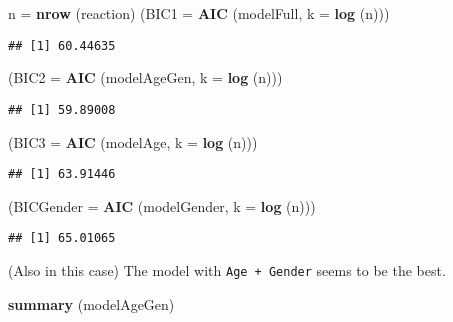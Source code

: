 \documentclass[
]{article}
\newenvironment{Shaded}{\begin{snugshade}}{\end{snugshade}}
\newcommand{\DataTypeTok}[1]{\textcolor[rgb]{0.13,0.29,0.53}{#1}}
\newcommand{\KeywordTok}[1]{\textcolor[rgb]{0.13,0.29,0.53}{\textbf{#1}}}
\newcommand{\NormalTok}[1]{#1}
\newcommand{\StringTok}[1]{\textcolor[rgb]{0.31,0.60,0.02}{#1}}
\begin{document}
\begin{Shaded}
\begin{Highlighting}[]
\NormalTok{n =}\StringTok{ }\KeywordTok{nrow}\NormalTok{ (reaction)}
\NormalTok{(}\DataTypeTok{BIC1 =} \KeywordTok{AIC}\NormalTok{ (modelFull, }\DataTypeTok{k =} \KeywordTok{log}\NormalTok{ (n)))}
\end{Highlighting}
\end{Shaded}

\begin{verbatim}
## [1] 60.44635
\end{verbatim}

\begin{Shaded}
\begin{Highlighting}[]
\NormalTok{(}\DataTypeTok{BIC2 =} \KeywordTok{AIC}\NormalTok{ (modelAgeGen, }\DataTypeTok{k =} \KeywordTok{log}\NormalTok{ (n)))}
\end{Highlighting}
\end{Shaded}

\begin{verbatim}
## [1] 59.89008
\end{verbatim}

\begin{Shaded}
\begin{Highlighting}[]
\NormalTok{(}\DataTypeTok{BIC3 =} \KeywordTok{AIC}\NormalTok{ (modelAge, }\DataTypeTok{k =} \KeywordTok{log}\NormalTok{ (n)))}
\end{Highlighting}
\end{Shaded}

\begin{verbatim}
## [1] 63.91446
\end{verbatim}

\begin{Shaded}
\begin{Highlighting}[]
\NormalTok{(}\DataTypeTok{BICGender =} \KeywordTok{AIC}\NormalTok{ (modelGender, }\DataTypeTok{k =} \KeywordTok{log}\NormalTok{ (n)))}
\end{Highlighting}
\end{Shaded}

\begin{verbatim}
## [1] 65.01065
\end{verbatim}

(Also in this case) The model with \texttt{Age\ +\ Gender} seems to be
the best.

\begin{Shaded}
\begin{Highlighting}[]
\KeywordTok{summary}\NormalTok{ (modelAgeGen)}
\end{Highlighting}
\end{Shaded}
\end{document}
